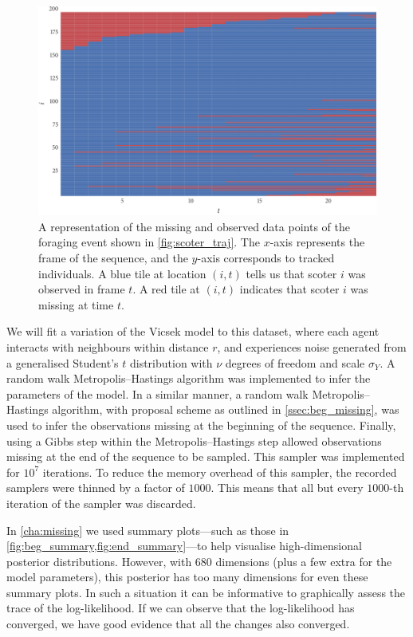 \begin{figure}[tb]
  \includegraphics{data_00_missing.pdf}
  \caption{A representation of the missing and observed data points of the
  foraging event shown in \cref{fig:scoter_traj}. The $x$-axis represents the
  frame of the sequence, and the $y$-axis corresponds to tracked individuals. A
  blue tile at location $(i,t)$ tells us that scoter $i$ was observed in frame
  $t$. A red tile at $(i,t)$ indicates that scoter $i$ was missing at time $t$.}
  \label{fig:scoter_missing}
\end{figure}

We will fit a variation of the Vicsek model to this dataset, where each agent
interacts with neighbours within distance $r$, and experiences noise generated
from a generalised Student's $t$ distribution with $\nu$ degrees of freedom and
scale $\sigma_Y$. A random walk Metropolis--Hastings algorithm was implemented
to infer the parameters of the model. In a similar manner, a random walk
Metropolis--Hastings algorithm, with proposal scheme as outlined in
\cref{ssec:beg_missing}, was used to infer the observations missing at the
beginning of the sequence. Finally, using a Gibbs step within the
Metropolis--Hastings step allowed observations missing at the end of the
sequence to be sampled. This sampler was implemented for $10^7$ iterations.
To reduce the memory overhead of this sampler, the recorded samplers were
thinned by a factor of $1000$. This means that all but every $1000$-th
iteration of the sampler was discarded.

In \cref{cha:missing} we used summary plots---such as those in
\cref{fig:beg_summary,fig:end_summary}---to help visualise high-dimensional
posterior distributions. However, with $680$ dimensions (plus a few extra for
the model parameters), this posterior has too many dimensions for even these
summary plots. In such a situation it can be informative to graphically assess
the trace of the log-likelihood. If we can observe that the log-likelihood has
converged, we have good evidence that all the changes also converged.

